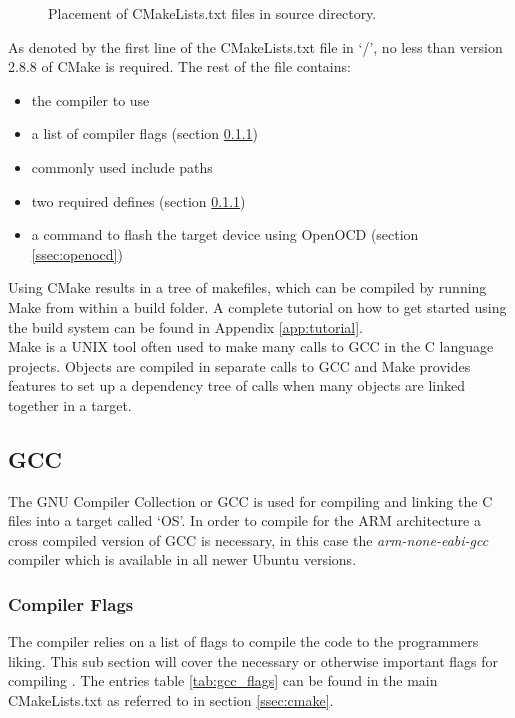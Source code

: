 \begin{figure}[H]
	\caption{Placement of CMakeLists.txt files in source directory.}
	\label{fig:cmake_files}
\end{figure}

As denoted by the first line of the CMakeLists.txt file in `/', no less than version 2.8.8 of CMake is required.
The rest of the file contains:

\begin{itemize}
	\item the compiler to use
	\item a list of compiler flags (section \ref{sssec:compiler_flags})
	\item commonly used include paths
	\item two required defines (section \ref{sssec:compiler_flags})
	\item a command to flash the target device using OpenOCD (section \ref{ssec:openocd})
\end{itemize}

Using CMake results in a tree of makefiles,
which can be compiled by running Make from within a build folder.
A complete tutorial on how to get started using the build system can be found in Appendix \ref{app:tutorial}.\\

Make is a UNIX tool\cite{gnu_make} often used to make many calls to GCC in the C language projects.
Objects are compiled in separate calls to GCC and
Make provides features to set up a dependency tree of calls when many objects are linked together in a target.


\subsection{GCC}
\label{ssec:gcc}
The GNU Compiler Collection or GCC is used for compiling and linking the C files into a target called `OS'.
In order to compile for the ARM architecture a cross compiled version of GCC is necessary,
in this case the \textit{arm-none-eabi-gcc} compiler which is available in all newer Ubuntu versions\cite{arm_gcc}.


\subsubsection{Compiler Flags}
\label{sssec:compiler_flags}
The compiler relies on a list of flags to compile the code to the programmers liking.
This sub section will cover the necessary or otherwise important flags for compiling \OSname{}.
The entries table \ref{tab:gcc_flags} can be found in the main CMakeLists.txt as referred to in section \ref{ssec:cmake}.

